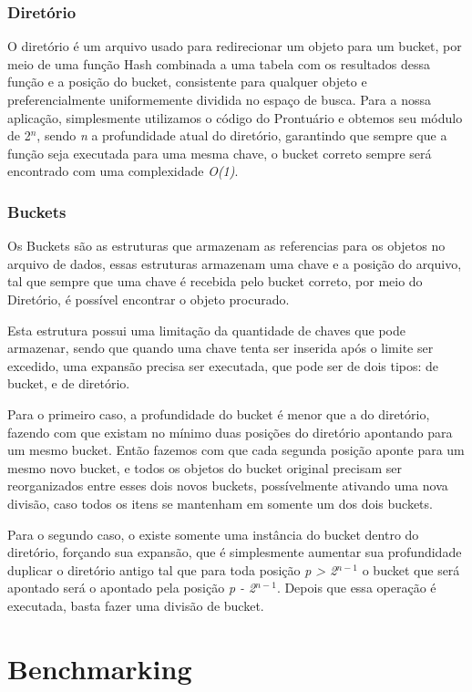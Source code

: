 \subsubsection{\esp Diretório}
\label{dir}
O diretório é um arquivo usado para redirecionar um objeto para um bucket, por meio de uma função Hash combinada a uma tabela com os resultados dessa função e a posição do bucket, consistente para qualquer objeto e preferencialmente uniformemente dividida no espaço de busca. Para a nossa aplicação, simplesmente utilizamos o código do Prontuário e obtemos seu módulo de 2$^n$, sendo \textit{n} a profundidade atual do diretório, garantindo que sempre que a função seja executada para uma mesma chave, o bucket correto sempre será encontrado com uma complexidade \textit{O(1)}.

\subsubsection{\esp Buckets}
Os Buckets são as estruturas que armazenam as referencias para os objetos no arquivo de dados, essas estruturas armazenam uma chave e a posição do arquivo, tal que sempre que uma chave é recebida pelo bucket correto, por meio do Diretório, é possível encontrar o objeto procurado. 

Esta estrutura possui uma limitação da quantidade de chaves que pode armazenar, sendo que quando uma chave tenta ser inserida após o limite ser excedido, uma expansão precisa ser executada, que pode ser de dois tipos: de bucket, e de diretório. 

Para o primeiro caso, a profundidade do bucket é menor que a do diretório, fazendo com que existam no mínimo duas posições do diretório apontando para um mesmo bucket. Então fazemos com que cada segunda posição aponte para um mesmo novo bucket, e todos os objetos do bucket original precisam ser reorganizados entre esses dois novos buckets, possívelmente ativando uma nova divisão, caso todos os itens se mantenham em somente um dos dois buckets.

Para o segundo caso, o existe somente uma instância do bucket dentro do diretório, forçando sua expansão, que é simplesmente aumentar sua profundidade duplicar o diretório antigo tal que para toda posição \textit{p > 2$^{n-1}$} o bucket que será apontado será o apontado pela posição \textit{p - 2$^{n-1}$}. Depois que essa operação é executada, basta fazer uma divisão de bucket.

\section{Benchmarking}

